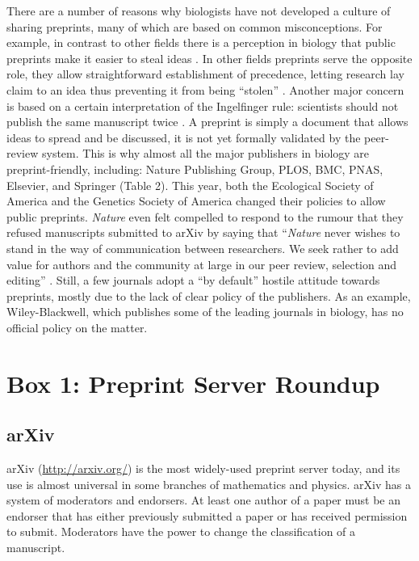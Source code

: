 \documentclass[10pt]{article}
\begin{document}
There are a number of reasons why biologists have not developed a culture of
sharing preprints, many of which are based on common misconceptions. For
example, in contrast to other fields there is a perception in biology that
public preprints make it easier to steal ideas \cite{gin11}. In other fields
preprints serve the opposite role, they allow straightforward establishment
of precedence, letting research lay claim to an idea thus preventing it from
being ``stolen'' \cite{gin11}. Another major concern is based on a certain
interpretation of the Ingelfinger rule: scientists should not publish the
same manuscript twice \cite{alt96}. A preprint is simply a document that
allows ideas to spread and be discussed, it is not yet formally validated by
the peer-review system. This is why almost all the major publishers in
biology are preprint-friendly, including: Nature Publishing Group, PLOS,
BMC, PNAS, Elsevier, and Springer (Table 2). This year, both the Ecological
Society of America and the Genetics Society of America changed their
policies to allow public preprints. \emph{Nature} even felt compelled to
respond to the rumour that they refused manuscripts submitted to arXiv by
saying that ``\emph{Nature} never wishes to stand in the way of
communication between researchers. We seek rather to add value for authors
and the community at large in our peer review, selection and editing'' \cite
{nat05}. Still, a few journals adopt a ``by default'' hostile attitude
towards preprints, mostly due to the lack of clear policy of the publishers.
As an example, Wiley-Blackwell, which publishes some of the leading journals
in biology, has no official policy on the matter.

\section*{Box 1: Preprint Server Roundup}

\subsection*{arXiv}

arXiv (\url{http://arxiv.org/}) is the most widely-used preprint server today,
and its use is almost universal in some branches of mathematics and physics.
arXiv has a system of moderators and endorsers. At least one author of a paper
must be an endorser that has either previously submitted a paper or has received
permission to submit.  Moderators have the power to change the classification of
a manuscript.
\end{document}
